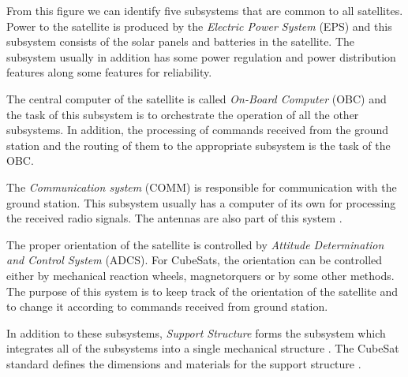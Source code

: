 \documentclass[english,12pt,a4paper,pdftex,elec,utf8]{aaltothesis}
\begin{document}
From this figure we can identify five subsystems that are common to all satellites. Power to the satellite is produced by the \textit{Electric Power System} (EPS) and this subsystem consists of the solar panels and batteries in the satellite. The subsystem usually in addition has some power regulation and power distribution features along some features for reliability. \cite{spacesystemsengineering}\par 
The central computer of the satellite is called \textit{On-Board Computer} (OBC) and the task of this subsystem is to orchestrate the operation of all the other subsystems. In addition, the processing of commands received from the ground station and the routing of them to the appropriate subsystem is the task of the OBC. \cite{spacesystemsengineering} \par 
The \textit{Communication system} (COMM) is responsible for communication with the ground station. This subsystem usually has a computer of its own for processing the received radio signals. The antennas are also part of this system \cite{spacesystemsengineering}. \par
The proper orientation of the satellite is controlled by \textit{Attitude Determination and Control System} (ADCS). For CubeSats, the orientation can be controlled either by mechanical reaction wheels, magnetorquers or by some other methods. The purpose of this system is to keep track of the orientation of the satellite and to change it according to commands received from ground station. \cite{spacesystemsengineering}\par 
In addition to these subsystems, \textit{Support Structure} forms the subsystem which integrates all of the subsystems into a single mechanical structure \cite{spacesystemsengineering}. The CubeSat standard defines the dimensions and materials for the support structure \cite{cds}.    
\end{document}
